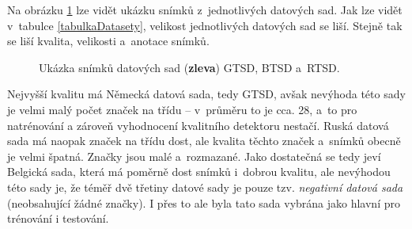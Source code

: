 Na obrázku \ref{fig:datasety} lze vidět ukázku snímků z~jednotlivých datových sad. Jak lze vidět v~tabulce \ref{tabulkaDatasety}, velikost jednotlivých datových sad se liší. Stejně tak se liší kvalita, velikosti a~anotace snímků.

\begin{figure}[H]
    \centering
    \hfill
    \hfill
    \caption{Ukázka snímků datových sad (\textbf{zleva}) GTSD, BTSD a~RTSD.}
    \label{fig:datasety}
\end{figure}

Nejvyšší kvalitu má Německá datová sada, tedy GTSD, avšak nevýhoda této sady je velmi malý počet značek na třídu -- v~průměru to je cca. 28, a~to pro natrénování a zároveň vyhodnocení kvalitního detektoru nestačí. Ruská datová sada má naopak značek na třídu dost, ale kvalita těchto značek a~snímků obecně je velmi špatná. Značky jsou malé a~rozmazané. Jako dostatečná se tedy jeví Belgická sada, která má poměrně dost snímků i~dobrou kvalitu, ale nevýhodou této sady je, že téměř dvě třetiny datové sady je pouze tzv. \emph{negativní datová sada} (neobsahující žádné značky). I přes to ale byla tato sada vybrána jako hlavní pro trénování i testování.




